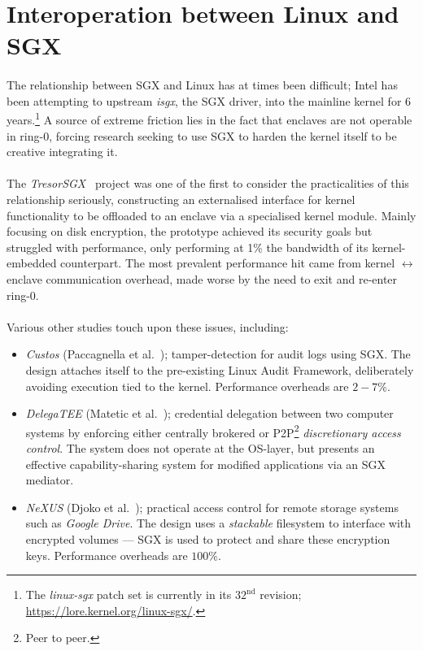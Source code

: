 \section{Interoperation between Linux and SGX} 
\paragraph{} The relationship between SGX and Linux has at times been difficult; Intel has been attempting to upstream \textit{isgx}, the SGX driver, into the mainline kernel for 6 years.\footnote{The \textit{linux-sgx} patch set is currently in its $32^{\text{nd}}$ revision; \url{https://lore.kernel.org/linux-sgx/}.} A source of extreme friction lies in the fact that enclaves are not operable in ring-0, forcing research seeking to use SGX to harden the kernel itself to be creative integrating it.

\paragraph{} The \textit{TresorSGX}~\cite{10.1145/3007788.3007796} project was one of the first to consider the practicalities of this relationship seriously, constructing an externalised interface for kernel functionality to be offloaded to an enclave via a specialised kernel module. Mainly focusing on disk encryption, the prototype achieved its security goals but struggled with performance, only performing at 1\% the bandwidth of its kernel-embedded counterpart. The most prevalent performance hit came from kernel $\leftrightarrow$ enclave communication overhead, made worse by the need to exit and re-enter ring-0.


\paragraph{} Various other studies touch upon these issues, including:

\begin{itemize}
    \item \textit{Custos} (Paccagnella et al.~\cite{Karande2017SGXLogSS}); tamper-detection for audit logs using SGX. The design attaches itself to the pre-existing Linux Audit Framework, deliberately avoiding execution tied to the kernel. Performance overheads are $2-7$\%. 
    \item \textit{DelegaTEE} (Matetic et al.~\cite{10.5555/3277203.3277308}); credential delegation between two computer systems by enforcing either centrally brokered or P2P\footnote{Peer to peer.} \textit{discretionary access control}. The system does not operate at the OS-layer, but presents an effective capability-sharing system for modified applications via an SGX mediator.
    \item \textit{NeXUS} (Djoko et al.~\cite{nexus8809505}); practical access control for remote storage systems such as \textit{Google Drive}. The design uses a \textit{stackable} filesystem to interface with encrypted volumes --- SGX is used to protect and share these encryption keys. Performance overheads are $100$\%.
\end{itemize}


